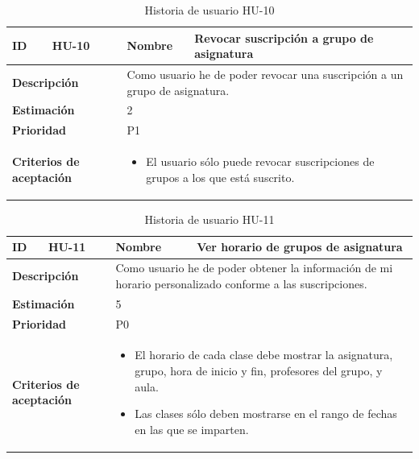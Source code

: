 \begin{table}[H]
    \centering
    \begin{tabular}{|p{2cm}|p{4cm}|p{2cm}|p{4cm}|}
        \hline
        \textbf{ID} & HU-10 & \textbf{Nombre} & Revocar suscripción a grupo de asignatura \\
        \hline
        \multicolumn{2}{|p{6cm}|}{\textbf{Descripción}} & \multicolumn{2}{p{6cm}|}{Como usuario he de poder revocar una suscripción a un grupo de asignatura.} \\
        \hline
        \multicolumn{2}{|p{6cm}|}{\textbf{Estimación}} & \multicolumn{2}{p{6cm}|}{2} \\
        \hline
        \multicolumn{2}{|p{6cm}|}{\textbf{Prioridad}} & \multicolumn{2}{p{6cm}|}{P1} \\
        \hline
        \multicolumn{2}{|p{6cm}|}{\textbf{Criterios de aceptación}} & \multicolumn{2}{p{6cm}|}{
            \begin{itemize}
                \item El usuario sólo puede revocar suscripciones de grupos a los que está suscrito.
            \end{itemize}
        } \\
        \hline
    \end{tabular}
    \caption{Historia de usuario HU-10}
    \label{tab:hu_10}
\end{table}

\begin{table}[H]
    \centering
    \begin{tabular}{|p{2cm}|p{4cm}|p{2cm}|p{4cm}|}
        \hline
        \textbf{ID} & HU-11 & \textbf{Nombre} & Ver horario de grupos de asignatura \\
        \hline
        \multicolumn{2}{|p{6cm}|}{\textbf{Descripción}} & \multicolumn{2}{p{6cm}|}{Como usuario he de poder obtener la información de mi horario personalizado conforme a las suscripciones.} \\
        \hline
        \multicolumn{2}{|p{6cm}|}{\textbf{Estimación}} & \multicolumn{2}{p{6cm}|}{5} \\
        \hline
        \multicolumn{2}{|p{6cm}|}{\textbf{Prioridad}} & \multicolumn{2}{p{6cm}|}{P0} \\
        \hline
        \multicolumn{2}{|p{6cm}|}{\textbf{Criterios de aceptación}} & \multicolumn{2}{p{6cm}|}{
            \begin{itemize}
                \item El horario de cada clase debe mostrar la asignatura, grupo, hora de inicio y fin, profesores del grupo, y aula.
                \item Las clases sólo deben mostrarse en el rango de fechas en las que se imparten.
            \end{itemize}
        } \\
        \hline
    \end{tabular}
    \caption{Historia de usuario HU-11}
    \label{tab:hu_11}
\end{table}

